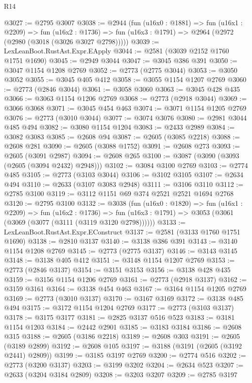 \begin{lexlean}{R14}
\begin{coremodule}
@3027 := @2795 @3007
@3038 := @2944
    (fun (u16x0 : @1881) =>
    fun (u16x1 : @2209) =>
    fun (u16x2 : @1736) => fun (u16x3 : @1791) => @2964 (@2972 (@2980 (@3018 (@3026 @3027 @2798)))))
@3039 := LexLeanBoot.RustAst.Expr.EApply
@3044 := @2581 (@3039 @2152 @1760 @1751 @1690)
@3045 := @2949 @3044
@3047 := @3045 @386 @391
@3050 := @3047 @1154 @1208 @2769
@3052 := @2773 (@2775 @3044)
@3053 := @3050 @3052
@3055 := @3045 @405 @412
@3058 := @3055 @1154 @1207 @2769
@3060 := @2773 (@2846 @3044)
@3061 := @3058 @3060
@3063 := @3045 @428 @435
@3066 := @3063 @1154 @1206 @2769
@3068 := @2773 (@2918 @3044)
@3069 := @3066 @3068
@3071 := @3045 @454 @463
@3074 := @3071 @1154 @1205 @2769
@3076 := @2773 (@3010 @3044)
@3077 := @3074 @3076
@3080 := @2981 @3044 @485 @494
@3082 := @3080 @1154 @1204
@3083 := @2433 @2989
@3084 := @3082 @3083
@3085 := @2608 @94
@3087 := @2605 (@3085 @2218)
@3088 := @2608 @281
@3090 := @2605 (@3088 @1752)
@3091 := @2608 @273
@3093 := @2605 (@3091 @2987)
@3094 := @2608 @265
@3100 := @3087 (@3090 (@3093 (@2605 (@3094 @2432) @2948)))
@3102 := @3084 @3100 @2769
@3103 := @2774 @485
@3105 := @2773 (@3103 @3044)
@3106 := @3102 @3105
@3107 := @2634 @494
@3110 := @2633 (@3107 @3083 @2948)
@3111 := @3106 @3110
@3112 := @2785 @3100
@3119 := @3112 @1151 @69 @374 @2521 @2521 @1694 @2768
@3120 := @2795 @3100
@3132 := @3038
    (fun (u16x0 : @1820) =>
    fun (u16x1 : @2209) =>
    fun (u16x2 : @1736) =>
    fun (u16x3 : @1791) => @3053 (@3061 (@3069 (@3077 (@3111 (@3119 @3120 @2798))))))
@3133 := LexLeanBoot.RustAst.Expr.EConstruct
@3137 := @2581 (@3133 @1760 @1751 @1690)
@3138 := @2810 @3137
@3140 := @3138 @386 @391
@3143 := @3140 @1154 @1208 @2769
@3145 := @2773 (@2775 @3137)
@3146 := @3143 @3145
@3148 := @3138 @405 @412
@3151 := @3148 @1154 @1207 @2769
@3153 := @2773 (@2846 @3137)
@3154 := @3151 @3153
@3156 := @3138 @428 @435
@3159 := @3156 @1154 @1206 @2769
@3161 := @2773 (@2918 @3137)
@3162 := @3159 @3161
@3164 := @3138 @454 @463
@3167 := @3164 @1154 @1205 @2769
@3169 := @2773 (@3010 @3137)
@3170 := @3167 @3169
@3172 := @3138 @485 @494
@3175 := @3172 @1154 @1204 @2769
@3177 := @2773 (@3103 @3137)
@3178 := @3175 @3177
@3181 := @2825 @3137 @516 @523
@3183 := @3181 @1154 @1203
@3184 := @2442 @2901
@3185 := @3183 @3184
@3186 := @2608 @315
@3188 := @2605 (@3186 @2218)
@3189 := @2608 @303
@3191 := @2605 (@3189 @2899)
@3192 := @2608 @105
@3197 := @3188 (@3191 (@2605 (@3192 @2441) @2809))
@3199 := @3185 @3197 @2769
@3200 := @2774 @516
@3202 := @2773 (@3200 @3137)
@3203 := @3199 @3202
@3204 := @2634 @523
@3207 := @2633 (@3204 @3184 @2809)
@3208 := @3203 @3207
@3209 := @2785 @3197

\end{coremodule}
\end{lexlean}

